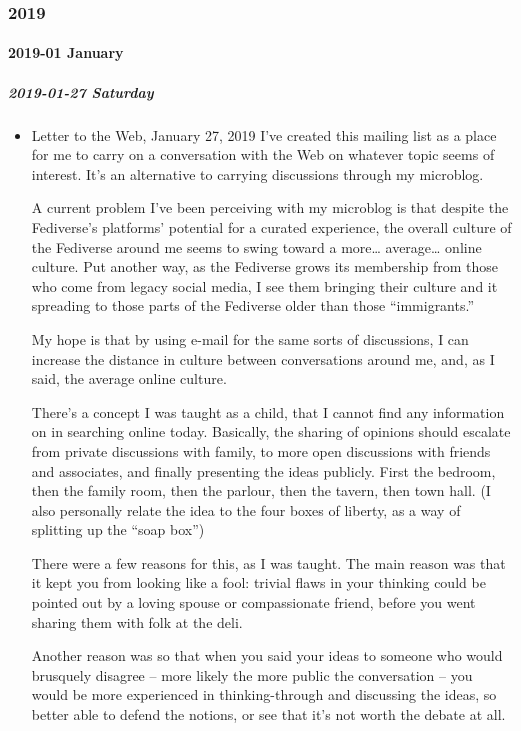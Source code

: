 \documentclass[11pt]{article}
\begin{document}
\subsubsection*{2019}
\label{sec:org6785865}
\startcontents[level-3]
\paragraph*{2019-01 January}
\label{sec:orga7fa962}
\startcontents[level-4]
\subparagraph*{2019-01-27 Saturday}
\label{sec:orgcdaced1}
\begin{itemize}
\item Letter to the Web, January 27, 2019
\label{sec:org41da43e}
I’ve created this mailing list as a place for me to carry on a conversation with the Web on whatever topic seems of interest. It’s an alternative to carrying discussions through my microblog.

A current problem I’ve been perceiving with my microblog is that despite the Fediverse’s platforms’ potential for a curated experience, the overall culture of the Fediverse around me seems to swing toward a more… average… online culture. Put another way, as the Fediverse grows its membership from those who come from legacy social media, I see them bringing their culture and it spreading to those parts of the Fediverse older than those “immigrants.”

My hope is that by using e-mail for the same sorts of discussions, I can increase the distance in culture between conversations around me, and, as I said, the average online culture.

There’s a concept I was taught as a child, that I cannot find any information on in searching online today. Basically, the sharing of opinions should escalate from private discussions with family, to more open discussions with friends and associates, and finally presenting the ideas publicly. First the bedroom, then the family room, then the parlour, then the tavern, then town hall. (I also personally relate the idea to the four boxes of liberty, as a way of splitting up the “soap box”)

There were a few reasons for this, as I was taught. The main reason was that it kept you from looking like a fool: trivial flaws in your thinking could be pointed out by a loving spouse or compassionate friend, before you went sharing them with folk at the deli.

Another reason was so that when you said your ideas to someone who would brusquely disagree – more likely the more public the conversation – you would be more experienced in thinking-through and discussing the ideas, so better able to defend the notions, or see that it’s not worth the debate at all.


\end{itemize}
\end{document}
